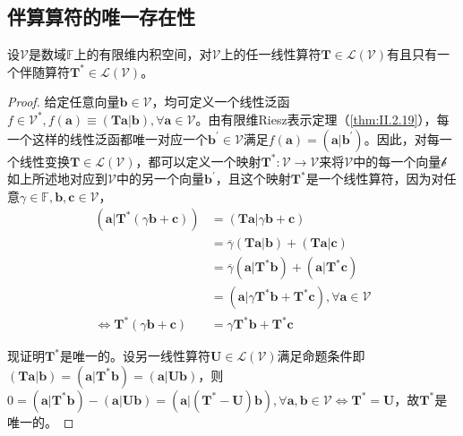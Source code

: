 \documentclass[main.tex]{subfiles}
\begin{document}
\subsection{伴算算符的唯一存在性}\label{sec:A.3.1}
\begin{theorem}
    设$\mathcal{V}$是数域$\mathbb{F}$上的有限维内积空间，对$\mathcal{V}$上的任一线性算符$\mathbf{T}\in\mathcal{L}\left(\mathcal{V}\right)$有且只有一个伴随算符$\mathbf{T}^*\in\mathcal{L}\left(\mathcal{V}\right)$。
\end{theorem}
\begin{proof}
    给定任意向量$\mathbf{b}\in\mathcal{V}$，均可定义一个线性泛函$f\in\mathcal{V}^*,f\left(\mathbf{a}\right)\equiv\left(\mathbf{Ta}|\mathbf{b}\right),\forall\mathbf{a}\in\mathcal{V}$。由有限维Riesz表示定理（\ref{thm:II.2.19}），每一个这样的线性泛函都唯一对应一个$\mathbf{b}^\prime\in\mathcal{V}$满足$f\left(\mathbf{a}\right)=\left(\mathbf{a}|\mathbf{b}^\prime\right)$。因此，对每一个线性变换$\mathbf{T}\in\mathcal{L}\left(\mathcal{V}\right)$，都可以定义一个映射$\mathbf{T}^*:\mathcal{V}\rightarrow\mathcal{V}$来将$\mathcal{V}$中的每一个向量$\mathcal{b}$如上所述地对应到$\mathcal{V}$中的另一个向量$\mathbf{b}^\prime$，且这个映射$\mathbf{T}^*$是一个线性算符，因为对任意$\gamma\in\mathbb{F},\mathbf{b},\mathbf{c}\in\mathcal{V}$，
    \begin{align*}
        \left(\mathbf{a}|\mathbf{T}^*\left(\gamma\mathbf{b}+\mathbf{c}\right)\right) & =\left(\mathbf{Ta}|\gamma\mathbf{b}+\mathbf{c}\right)                                                           \\
                                                                                     & =\overline{\gamma}\left(\mathbf{Ta}|\mathbf{b}\right)+\left(\mathbf{Ta}|\mathbf{c}\right)                       \\
                                                                                     & =\overline{\gamma}\left(\mathbf{a}|\mathbf{T}^*\mathbf{b}\right)+\left(\mathbf{a}|\mathbf{T}^*\mathbf{c}\right) \\
                                                                                     & =\left(\mathbf{a}|\gamma\mathbf{T}^*\mathbf{b}+\mathbf{T}^*\mathbf{c}\right),\forall\mathbf{a}\in\mathcal{V}    \\
        \Leftrightarrow\mathbf{T}^*\left(\gamma\mathbf{b}+\mathbf{c}\right)          & =\gamma\mathbf{T}^*\mathbf{b}+\mathbf{T}^*\mathbf{c}
    \end{align*}

    现证明$\mathbf{T}^*$是唯一的。设另一线性算符$\mathbf{U}\in\mathcal{L}\left(\mathcal{V}\right)$满足命题条件即$\left(\mathbf{Ta}|\mathbf{b}\right)=\left(\mathbf{a}|\mathbf{T}^*\mathbf{b}\right)=\left(\mathbf{a}|\mathbf{Ub}\right)$，则$0=\left(\mathbf{a}|\mathbf{T}^*\mathbf{b}\right)-\left(\mathbf{a}|\mathbf{Ub}\right)=\left(\mathbf{a}|\left(\mathbf{T}^*-\mathbf{U}\right)\mathbf{b}\right),\forall\mathbf{a},\mathbf{b}\in\mathcal{V}\Leftrightarrow\mathbf{T}^*=\mathbf{U}$，故$\mathbf{T}^*$是唯一的。
\end{proof}
\end{document}
